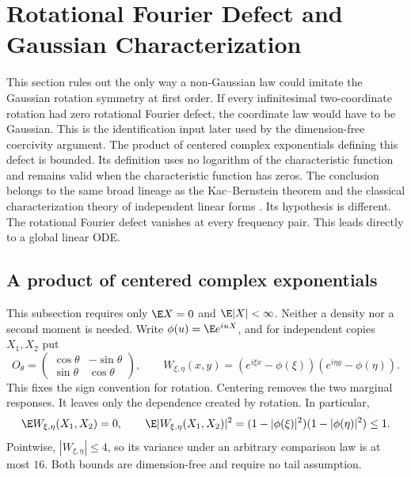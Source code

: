 \section{Rotational Fourier Defect and Gaussian Characterization}
\label{sec:rotational-fourier-defect-and-gaussian-characterization}

This section rules out the only way a non-Gaussian law could imitate the
Gaussian rotation symmetry at first order.
If every infinitesimal two-coordinate rotation had zero rotational Fourier
defect, the coordinate law would have to be Gaussian.
This is the identification input later used by the dimension-free
coercivity argument.
The product of centered complex exponentials defining this defect is bounded.
Its definition uses no logarithm of the characteristic function and remains
valid when the characteristic function has zeros.
The conclusion belongs to the same broad lineage as the Kac--Bernstein
theorem and the classical characterization theory of independent linear
forms \cite{kac1939characterization,kagan1973characterization}.
Its hypothesis is different.
The rotational Fourier defect vanishes at every frequency pair.
This leads directly to a global linear ODE.

\subsection{A product of centered complex exponentials}
\label{sec:product-of-centered-exponentials}

This subsection requires only $\E X=0$ and $\E|X|<\infty$.
Neither a density nor a second moment is needed.
Write
$\phi(u)=\E e^{iuX}$, and for independent copies $X_1,X_2$ put
\[
 O_\theta=\begin{pmatrix}\cos\theta&-\sin\theta\\
                         \sin\theta&\cos\theta\end{pmatrix},
 \qquad
 W_{\xi,\eta}(x,y)
   =(e^{i\xi x}-\phi(\xi))(e^{i\eta y}-\phi(\eta)).
\]
This fixes the sign convention for rotation.
Centering removes the two marginal responses.
It leaves only the dependence created by rotation.
In particular,
\begin{equation}
 \E W_{\xi,\eta}(X_1,X_2)=0,
 \qquad
 \E|W_{\xi,\eta}(X_1,X_2)|^2
 =(1-|\phi(\xi)|^2)(1-|\phi(\eta)|^2)\le1.
 \label{eq:centered-exponential-product-variance}
\end{equation}
Pointwise, $|W_{\xi,\eta}|\le4$, so its variance under an arbitrary
comparison law is at most $16$.  Both bounds are dimension-free and require
no tail assumption.

